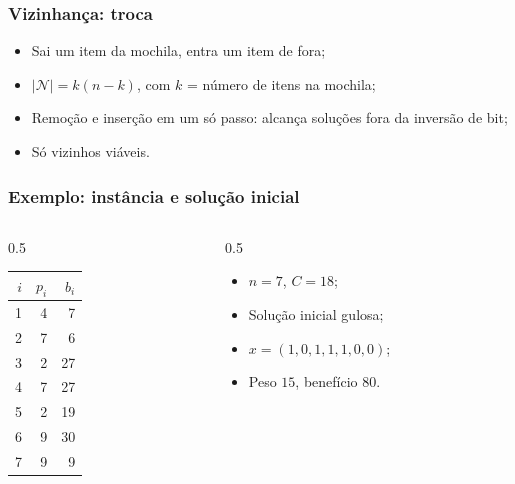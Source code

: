 \documentclass[fleqn]{beamer}
\newcommand{\vetor}[2]{%
	\foreach \v [count=\i] in {#2}{%
		\node[bit\v] at (\i*0.65,#1) {\v};
	}%
}
\newcommand{\destaque}[2]{%
	\draw[red,very thick] ({#2*0.65-0.3},{#1-0.3}) rectangle ({#2*0.65+0.3},{#1+0.3});
}
\begin{document}
\begin{frame}
	\frametitle{Vizinhança: troca}
	\begin{center}
	\end{center}
	\begin{itemize}
		\item Sai um item da mochila, entra um item de fora;
		\item $|\mathcal{N}| = k(n-k)$, com $k$ = número de itens na
			mochila;
		\item Remoção e inserção em um só passo: alcança soluções fora da
			inversão de bit;
		\item Só vizinhos viáveis.
	\end{itemize}
\end{frame}

\begin{frame}
	\frametitle{Exemplo: instância e solução inicial}
	\begin{columns}[T]
	\begin{column}{0.5\textwidth}
	\begin{center}
	\begin{tabular}{rrr}
		\toprule
		$i$ & $p_i$ & $b_i$ \\
		\midrule
		1 & 4 & 7 \\
		2 & 7 & 6 \\
		3 & 2 & 27 \\
		4 & 7 & 27 \\
		5 & 2 & 19 \\
		6 & 9 & 30 \\
		7 & 9 & 9 \\
		\bottomrule
	\end{tabular}
	\end{center}
	\end{column}
	\begin{column}{0.5\textwidth}
	\begin{itemize}
		\item $n = 7$, $C = 18$;
		\item Solução inicial gulosa;
		\item $x = (1,0,1,1,1,0,0)$;
		\item Peso $15$, benefício $80$.
	\end{itemize}
	\end{column}
	\end{columns}
\end{frame}
\end{document}
